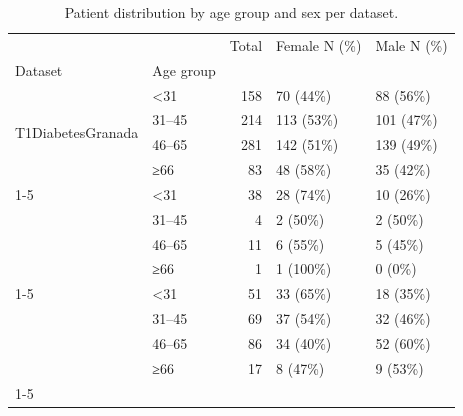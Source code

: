 \begin{table}
\caption{Patient distribution by age group and sex per dataset.}
\label{tab:demographic_summary}
\begin{tabular}{llrll}
\toprule
 &  & Total & Female N (\%) & Male N (\%) \\
Dataset & Age group &  &  &  \\
\midrule
\multirow[t]{4}{*}{T1DiabetesGranada} & <31 & 158 & 70 (44\%) & 88 (56\%) \\
 & 31–45 & 214 & 113 (53\%) & 101 (47\%) \\
 & 46–65 & 281 & 142 (51\%) & 139 (49\%) \\
 & ≥66 & 83 & 48 (58\%) & 35 (42\%) \\
\cline{1-5}
\multirow[t]{4}{*}{DiaTrend} & <31 & 38 & 28 (74\%) & 10 (26\%) \\
 & 31–45 & 4 & 2 (50\%) & 2 (50\%) \\
 & 46–65 & 11 & 6 (55\%) & 5 (45\%) \\
 & ≥66 & 1 & 1 (100\%) & 0 (0\%) \\
\cline{1-5}
\multirow[t]{4}{*}{ReplaceBG} & <31 & 51 & 33 (65\%) & 18 (35\%) \\
 & 31–45 & 69 & 37 (54\%) & 32 (46\%) \\
 & 46–65 & 86 & 34 (40\%) & 52 (60\%) \\
 & ≥66 & 17 & 8 (47\%) & 9 (53\%) \\
\cline{1-5}
\bottomrule
\end{tabular}
\end{table}

